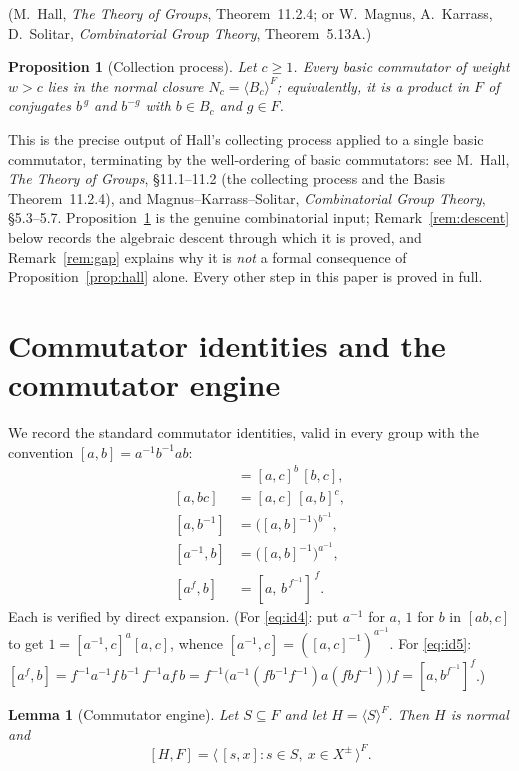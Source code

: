 \documentclass{amsart}
\newtheorem{lemma}{Lemma}
\newtheorem{proposition}{Proposition}
\theoremstyle{definition}
\theoremstyle{remark}
\begin{document}
\noindent
(M.\ Hall, \emph{The Theory of Groups}, Theorem~11.2.4; or
W.\ Magnus, A.\ Karrass, D.\ Solitar, \emph{Combinatorial Group Theory},
Theorem~5.13A.)

\begin{proposition}[Collection process]\label{prop:collect}
Let $c\ge 1$. Every basic commutator of weight $w>c$ lies in the normal closure
$N_c=\langle B_c\rangle^{F}$; equivalently, it is a product in $F$ of conjugates
$b^{\,g}$ and $b^{-g}$ with $b\in B_c$ and $g\in F$.
\end{proposition}

\noindent
This is the precise output of Hall's collecting process applied to a single basic
commutator, terminating by the well-ordering of basic commutators: see
M.\ Hall, \emph{The Theory of Groups}, \S11.1--11.2 (the collecting process and
the Basis Theorem~11.2.4), and Magnus--Karrass--Solitar, \emph{Combinatorial
Group Theory}, \S5.3--5.7. Proposition~\ref{prop:collect} is the genuine
combinatorial input; Remark~\ref{rem:descent} below records the algebraic descent
through which it is proved, and Remark~\ref{rem:gap} explains why it is \emph{not}
a formal consequence of Proposition~\ref{prop:hall} alone. Every other step in
this paper is proved in full.

\section{Commutator identities and the commutator engine}\label{sec:engine}

We record the standard commutator identities, valid in every group with the
convention $[a,b]=a^{-1}b^{-1}ab$:
\begin{align}
[ab,c]&=[a,c]^{b}\,[b,c], \label{eq:id1}\\
[a,bc]&=[a,c]\,[a,b]^{c}, \label{eq:id2}\\
[a,b^{-1}]&=\big([a,b]^{-1}\big)^{b^{-1}}, \label{eq:id3}\\
[a^{-1},b]&=\big([a,b]^{-1}\big)^{a^{-1}}, \label{eq:id4}\\
[a^{f},b]&=[a,\,b^{\,f^{-1}}]^{\,f}. \label{eq:id5}
\end{align}
Each is verified by direct expansion. (For \eqref{eq:id4}: put $a^{-1}$ for $a$,
$1$ for $b$ in $[ab,c]$ to get $1=[a^{-1},c]^{a}[a,c]$, whence
$[a^{-1},c]=([a,c]^{-1})^{a^{-1}}$. For \eqref{eq:id5}:
$[a^f,b]=f^{-1}a^{-1}f\,b^{-1}\,f^{-1}af\,b
=f^{-1}\big(a^{-1}(fb^{-1}f^{-1})a(fbf^{-1})\big)f=[a,b^{f^{-1}}]^{f}$.)

\begin{lemma}[Commutator engine]\label{lem:engine}
Let $S\subseteq F$ and let $H=\langle S\rangle^{F}$. Then $H$ is normal and
\begin{equation}\label{eq:engine}
[H,F]=\big\langle\,[s,x] : s\in S,\ x\in X^{\pm}\,\big\rangle^{F}.
\end{equation}
\end{lemma}
\end{document}
